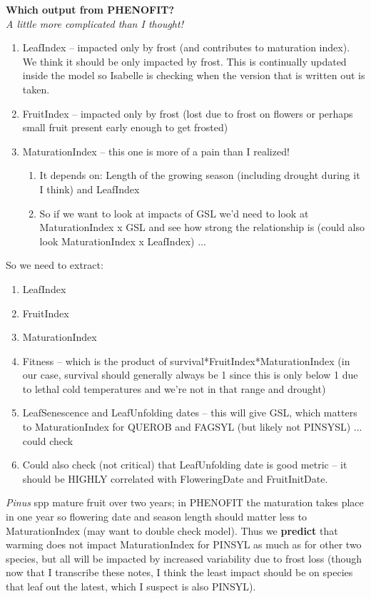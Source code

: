 \documentclass[11pt,letter]{article}
\begin{document}
{\bf Which output from PHENOFIT?}\\

\emph{A little more complicated than I thought!}

\begin{enumerate}
\item LeafIndex -- impacted only by frost (and contributes to maturation index). We think it should be only impacted by frost. This is continually updated inside the model so Isabelle is checking when the version that is written out is taken. 
\item FruitIndex -- impacted only by frost (lost due to frost on flowers or perhaps small fruit present early enough to get frosted)
\item MaturationIndex -- this one is more of a pain than I realized! 
\begin{enumerate}
\item It depends on: Length of the growing season (including drought during it I think) and LeafIndex
\item So if we want to look at impacts of GSL we'd need to look at MaturationIndex x GSL and see how strong the relationship is (could also look MaturationIndex x LeafIndex) ... 
\end{enumerate}
\end{enumerate}

So we need to extract: 

\begin{enumerate}
\item LeafIndex
\item FruitIndex 
\item MaturationIndex
\item Fitness -- which is the product of survival*FruitIndex*MaturationIndex (in our case, survival should generally always be 1 since this is only below 1 due to lethal cold temperatures and we're not in that range and drought)
\item LeafSenescence and LeafUnfolding dates -- this will give GSL, which matters to MaturationIndex for QUEROB and FAGSYL (but likely not PINSYSL) ... could check
\item Could also check (not critical) that LeafUnfolding date is good metric -- it should be HIGHLY correlated with FloweringDate and FruitInitDate. 
\end{enumerate}

\emph{Pinus} spp mature fruit over two years; in PHENOFIT the maturation takes place in one year so flowering date and season length should matter less to MaturationIndex (may want to double check model). Thus we {\bf predict} that warming does not impact MaturationIndex for PINSYL as much as for other two species, but all will be impacted by increased variability due to frost loss (though now that I transcribe these notes, I think the least impact should be on species that leaf out the latest, which I suspect is also PINSYL).  \\
\end{document}
